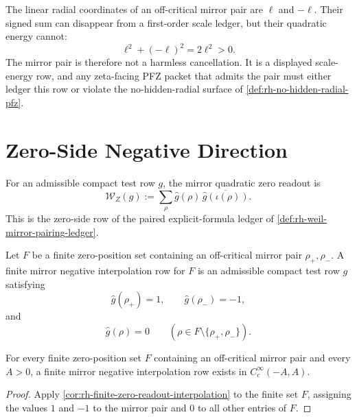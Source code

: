 \begin{principle}
\label{prin:rh-mirror-scale-quadratic-residual-data}
The linear radial coordinates of an off-critical mirror pair are
$\ell$ and $-\ell$.  Their signed sum can disappear from a first-order
scale ledger, but their quadratic energy cannot:
$$
\ell^2+(-\ell)^2=2\ell^2>0.
$$
The mirror pair is therefore not a harmless cancellation.  It is a
displayed scale-energy row, and any zeta-facing PFZ packet that admits
the pair must either ledger this row or violate the no-hidden-radial
surface of \autoref{def:rh-no-hidden-radial-pfz}.
\end{principle}

\section{Zero-Side Negative Direction}
\label{sec:rh-negative-weil-zero-side-direction}

\begin{definition}
\label{def:rh-mirror-quadratic-zero-readout}
For an admissible compact test row $g$, the mirror quadratic zero
readout is
$$
\mathcal W_Z(g)
:=
\sum_{\rho}
\widehat g(\rho)\,
\overline{\widehat g(\iota(\rho))}.
$$
This is the zero-side row of the paired explicit-formula ledger of
\autoref{def:rh-weil-mirror-pairing-ledger}.
\end{definition}

\begin{definition}
\label{def:rh-finite-mirror-negative-interpolation}
Let $F$ be a finite zero-position set containing an off-critical mirror
pair $\rho_+,\rho_-$.  A finite mirror negative interpolation row for
$F$ is an admissible compact test row $g$ satisfying
$$
\widehat g(\rho_+)=1,
\qquad
\widehat g(\rho_-)=-1,
$$
and
$$
\widehat g(\rho)=0
\qquad
(\rho\in F\setminus\{\rho_+,\rho_-\}).
$$
\end{definition}

\begin{lemma}
\label{lem:rh-finite-mirror-negative-interpolation-exists}
For every finite zero-position set $F$ containing an off-critical mirror
pair and every $A>0$, a finite mirror negative interpolation row exists
in $C_c^\infty(-A,A)$.
\end{lemma}

\begin{proof}
Apply \autoref{cor:rh-finite-zero-readout-interpolation} to the finite
set $F$, assigning the values $1$ and $-1$ to the mirror pair and $0$ to
all other entries of $F$.
\end{proof}

